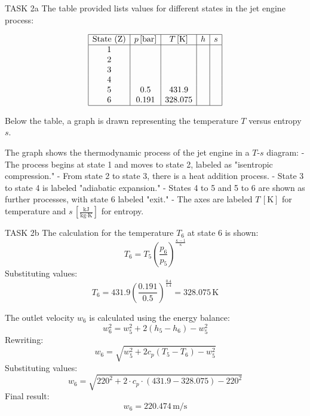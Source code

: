TASK 2a  
The table provided lists values for different states in the jet engine process:  

\[
\begin{array}{|c|c|c|c|c|}
\hline
\text{State (Z)} & p \, [\text{bar}] & T \, [\text{K}] & h & s \\
\hline
1 & & & & \\
2 & & & & \\
3 & & & & \\
4 & & & & \\
5 & 0.5 & 431.9 & & \\
6 & 0.191 & 328.075 & & \\
\hline
\end{array}
\]

Below the table, a graph is drawn representing the temperature \( T \) versus entropy \( s \).  

The graph shows the thermodynamic process of the jet engine in a \( T \)-\( s \) diagram:  
- The process begins at state 1 and moves to state 2, labeled as "isentropic compression."  
- From state 2 to state 3, there is a heat addition process.  
- State 3 to state 4 is labeled "adiabatic expansion."  
- States 4 to 5 and 5 to 6 are shown as further processes, with state 6 labeled "exit."  
- The axes are labeled \( T \, [\text{K}] \) for temperature and \( s \, [\frac{\text{kJ}}{\text{kg·K}}] \) for entropy.  

TASK 2b  
The calculation for the temperature \( T_6 \) at state 6 is shown:  
\[
T_6 = T_5 \left( \frac{p_6}{p_5} \right)^{\frac{\kappa - 1}{\kappa}}
\]
Substituting values:  
\[
T_6 = 431.9 \left( \frac{0.191}{0.5} \right)^{\frac{0.4}{1.4}} = 328.075 \, \text{K}
\]

The outlet velocity \( w_6 \) is calculated using the energy balance:  
\[
w_6^2 = w_5^2 + 2 \left( h_5 - h_6 \right) - w_5^2
\]
Rewriting:  
\[
w_6 = \sqrt{w_5^2 + 2 c_p \left( T_5 - T_6 \right) - w_5^2}
\]
Substituting values:  
\[
w_6 = \sqrt{220^2 + 2 \cdot c_p \cdot (431.9 - 328.075) - 220^2}
\]
Final result:  
\[
w_6 = 220.474 \, \text{m/s}
\]